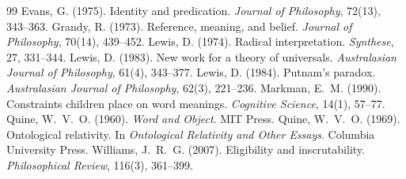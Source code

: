 \documentclass{situationist-preprint}
\begin{document}
\begin{thebibliography}{99}\small
{} Evans, G. (1975). Identity and predication. \emph{Journal of Philosophy}, 72(13), 343--363.
 Grandy, R. (1973). Reference, meaning, and belief. \emph{Journal of Philosophy}, 70(14), 439--452.
 Lewis, D. (1974). Radical interpretation. \emph{Synthese}, 27, 331--344.
 Lewis, D. (1983). New work for a theory of universals. \emph{Australasian Journal of Philosophy}, 61(4), 343--377.
 Lewis, D. (1984). Putnam's paradox. \emph{Australasian Journal of Philosophy}, 62(3), 221--236.
 Markman, E.~M. (1990). Constraints children place on word meanings. \emph{Cognitive Science}, 14(1), 57--77.
 Quine, W.~V.~O. (1960). \emph{Word and Object}. MIT Press.
 Quine, W.~V.~O. (1969). Ontological relativity. In \emph{Ontological Relativity and Other Essays}. Columbia University Press.
 Williams, J.~R.~G. (2007). Eligibility and inscrutability. \emph{Philosophical Review}, 116(3), 361--399.
\end{thebibliography}
\end{document}
